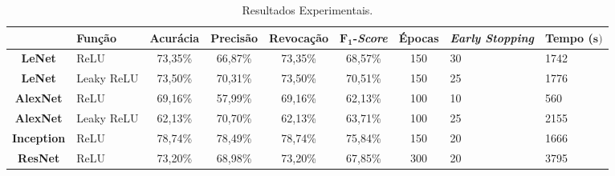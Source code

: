 
\begin{table}
    \caption{Resultados Experimentais.} \label{tab:results}
\begin{center}
    \begin{footnotesize}
\begin{tabular}{cp{1cm}cccccp{1.2cm}p{1cm}}
\toprule
    & \textbf{Função} & \textbf{Acurácia} & \textbf{Precisão} & \textbf{Revocação}& $\mathbf{F_1}$\textbf{-\emph{Score}} & \textbf{Épocas} & \textbf{\emph{Early Stopping}} & \textbf{Tempo ($\mathbf{s})$} \\
\midrule
\textbf{LeNet} & ReLU & 73,35\% & 66,87\% & 73,35\% & 68,57\% & 150 & 30 & 1742 \\
\textbf{LeNet} & Leaky ReLU & 73,50\% & 70,31\% & 73,50\% & 70,51\% & 150 & 25 & 1776 \\
\midrule
\textbf{AlexNet} & ReLU & 69,16\% & 57,99\% & 69,16\% & 62,13\% & 100  & 10 & 560 \\
\textbf{AlexNet} & Leaky ReLU & 62,13\% & 70,70\% & 62,13\% & 63,71\% & 100  & 25 & 2155 \\
\midrule
\textcolor{imperialblue}{\textbf{Inception}} & \textcolor{imperialblue}{ReLU} & \textcolor{imperialblue}{78,74\%} & \textcolor{imperialblue}{78,49\%} & \textcolor{imperialblue}{78,74\%} & \textcolor{imperialblue}{75,84\%} & \textcolor{imperialblue}{150} & \textcolor{imperialblue}{20} & \textcolor{imperialblue}{1666} \\
\midrule
\textbf{ResNet} & ReLU & 73,20\% & 68,98\% & 73,20\% & 67,85\% & 300 & 20 & 3795 \\
\bottomrule
\end{tabular}
\end{footnotesize}
\end{center}
\end{table}

